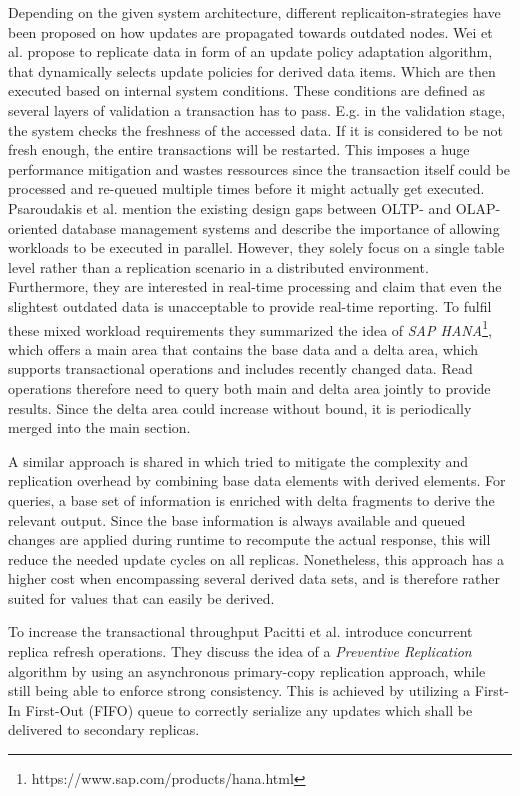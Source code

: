 Depending on the given system architecture, different replicaiton-strategies have been proposed on how updates are propagated towards outdated nodes.
Wei et al. \cite{wei:2004} propose to replicate data in form of an update policy adaptation algorithm, that dynamically selects update policies
for derived data items. Which are then executed based on internal system conditions. These conditions are defined as several layers of validation a transaction has to pass.
E.g. in the validation stage, the system checks the freshness of the accessed data. If it is considered to be not fresh enough, the entire transactions will be restarted.
This imposes a huge performance mitigation and wastes ressources since the transaction itself could be processed and re-queued multiple times before it might actually get executed.\\
Psaroudakis et al. \cite{psaroudakis:2015} mention the existing design gaps between OLTP- and OLAP-oriented database management systems and describe the importance of 
allowing workloads to be executed in parallel. However, they solely focus on a single table level rather than a replication scenario in a distributed 
environment. Furthermore, they are interested in real-time processing and claim that even the slightest outdated data is unacceptable to provide real-time reporting.
To fulfil these mixed workload requirements they summarized the idea of \emph{SAP HANA}\footnote{https://www.sap.com/products/hana.html}, which offers a main area that contains the base data and a delta area, 
which supports transactional operations and includes recently changed data. Read operations therefore need to query both main and delta area jointly to provide results. 
Since the delta area could increase without bound, it is periodically merged into the main section. 


A similar approach is shared in \cite{wei:2004} which tried to mitigate the complexity and replication overhead by combining base data elements with derived elements.
For queries, a base set of information is enriched with delta fragments to derive the relevant output.
Since the base information is always available and queued changes are applied during runtime to recompute 
the actual response, this will reduce the needed update cycles on all replicas. Nonetheless, this approach has a higher cost when encompassing several derived data sets, and 
is therefore rather suited for values that can easily be derived.


To increase the transactional throughput Pacitti et al. \cite{pacitti:2005} introduce concurrent replica refresh operations.
They discuss the idea of a \emph{Preventive Replication} algorithm by using an asynchronous primary-copy replication approach, while still being able to enforce
strong consistency. This is achieved by utilizing a First-In First-Out (FIFO) queue to correctly serialize any updates which shall be delivered to secondary replicas.

